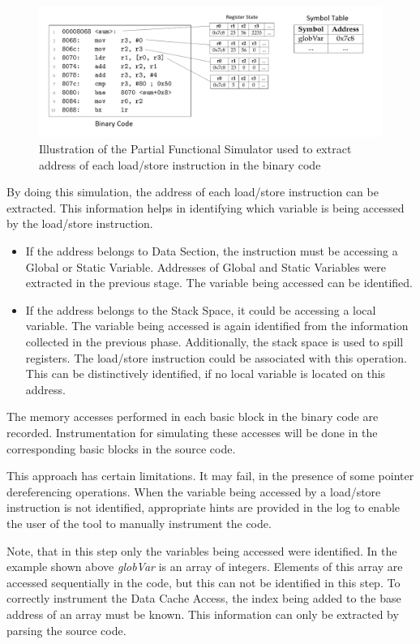 \begin{figure}[h]
\centering
\includegraphics[width=\textwidth]{figures/ParitalSimulator.png}
\caption{Illustration of the Partial Functional Simulator used to extract address of each load/store instruction in the binary code}
\label{fig:partialSimulator}
\end{figure}

By doing this simulation, the address of each load/store instruction can be extracted. This information helps in identifying which variable is being accessed by the load/store instruction. 

\begin{itemize}
\item If the address belongs to Data Section, the instruction must be accessing a Global or Static Variable. Addresses of Global and Static Variables were extracted in the previous stage. The variable being accessed can be identified. 
\item If the address belongs to the Stack Space, it could be accessing a local variable. The variable being accessed is again identified from the information collected in the previous phase. Additionally, the stack space is used to spill registers. The load/store instruction could be associated with this operation. This can be distinctively identified, if no local variable is located on this address.
\end{itemize}

The memory accesses performed in each basic block in the binary code are recorded. Instrumentation for simulating these accesses will be done in the corresponding basic blocks in the source code. 

This approach has certain limitations. It may fail, in the presence of some pointer dereferencing operations. When the variable being accessed by a load/store instruction is not identified, appropriate hints are provided in the log to enable the user of the tool to manually instrument the code.

Note, that in this step only the variables being accessed were identified. In the example shown above \emph{globVar} is an array of integers. Elements of this array are accessed sequentially in the code, but this can not be identified in this step. To correctly instrument the Data Cache Access, the index being added to the base address of an array must be known. This information can only be extracted by parsing the source code.

